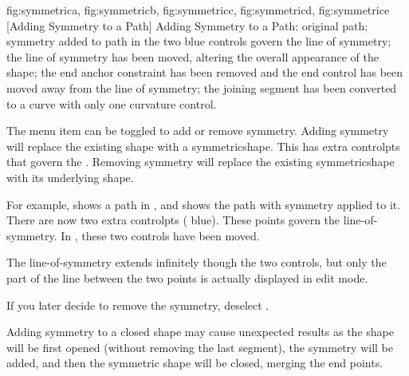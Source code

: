 {
  {fig:symmetrica}{}{},
  {fig:symmetricb}{}{},
  {fig:symmetricc}{}{},
  {fig:symmetricd}{}{},
  {fig:symmetrice}{}{}
}
[Adding Symmetry to a Path]
{Adding Symmetry to a Path:  original path;
 symmetry added to path in  the
two blue controls govern the line of symmetry;
 the line of symmetry has been moved, altering the
overall appearance of the shape;  the end anchor
constraint has been removed and the end control has been moved
away from the line of symmetry;  the joining segment
has been converted to a curve with only one curvature control.}


The  menu item can be toggled
to add or remove \gls{symmetry}. Adding symmetry will replace the existing
\gls{shape} with a \gls{symmetricshape}. This has extra
\glspl{controlpt} that govern the .
Removing \gls{symmetry} will replace the existing \gls{symmetricshape}
with its underlying \gls{shape}.

For example,  shows a \gls*{path}
in \editpathmode, and  shows the
path with \gls{symmetry} applied to it. There are now two extra
\glspl{controlpt} ( blue). These points govern the 
\gls{line-of-symmetry}. In , these two controls
have been moved.

\begin{information}
The \gls{line-of-symmetry} extends infinitely though the two controls,
but only the part of the line between the two points is actually
displayed in edit mode.
\end{information}

If you later decide to remove the symmetry, deselect
.

\begin{warning}
Adding \gls{symmetry} to a closed shape may cause unexpected
results as the shape will be first opened (without removing the
last segment), the \gls{symmetry} will be added, and then the symmetric
shape will be closed, merging the end points.
\end{warning}

